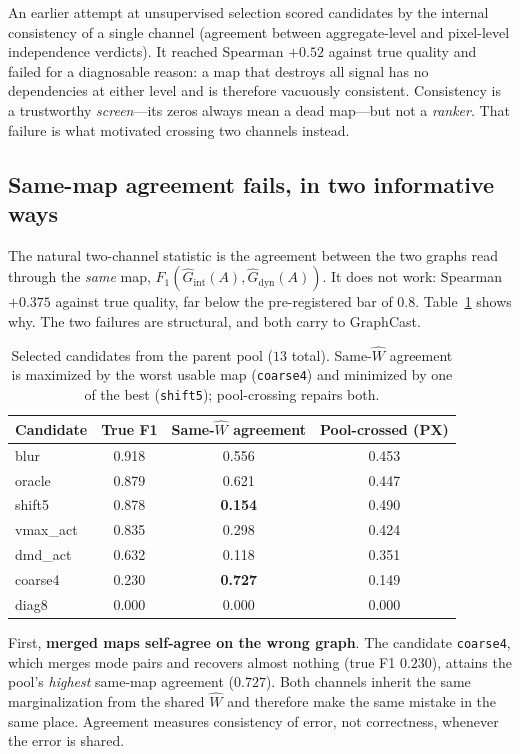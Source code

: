 An earlier attempt at unsupervised selection scored candidates by the internal
consistency of a single channel (agreement between aggregate-level and
pixel-level independence verdicts). It reached Spearman $+0.52$ against true
quality and failed for a diagnosable reason: a map that destroys all signal has no
dependencies at either level and is therefore vacuously consistent. Consistency is
a trustworthy \emph{screen}---its zeros always mean a dead map---but not a
\emph{ranker}. That failure is what motivated crossing two channels instead.

\subsection{Same-map agreement fails, in two informative ways}

The natural two-channel statistic is the agreement between the two graphs read
through the \emph{same} map, $F_1(\hat G_{\text{int}}(A), \hat G_{\text{dyn}}(A))$.
It does not work: Spearman $+0.375$ against true quality, far below the
pre-registered bar of $0.8$. Table~\ref{tab:samew} shows why. The two failures are
structural, and both carry to GraphCast.

\begin{table}[h]
\centering
\small
\begin{tabular}{lccc}
\toprule
Candidate & True F1 & Same-$\hat W$ agreement & Pool-crossed (PX) \\
\midrule
blur      & 0.918 & 0.556 & 0.453 \\
oracle    & 0.879 & 0.621 & 0.447 \\
shift5    & 0.878 & \textbf{0.154} & 0.490 \\
vmax\_act & 0.835 & 0.298 & 0.424 \\
dmd\_act  & 0.632 & 0.118 & 0.351 \\
coarse4   & 0.230 & \textbf{0.727} & 0.149 \\
diag8     & 0.000 & 0.000 & 0.000 \\
\bottomrule
\end{tabular}
\caption{Selected candidates from the parent pool ($13$ total). Same-$\hat W$
agreement is maximized by the worst usable map (\texttt{coarse4}) and minimized by
one of the best (\texttt{shift5}); pool-crossing repairs both.}
\label{tab:samew}
\end{table}

First, \textbf{merged maps self-agree on the wrong graph}. The candidate
\texttt{coarse4}, which merges mode pairs and recovers almost nothing
(true F1 $0.230$), attains the pool's \emph{highest} same-map agreement
($0.727$). Both channels inherit the same marginalization from the shared $\hat W$
and therefore make the same mistake in the same place. Agreement measures
consistency of error, not correctness, whenever the error is shared.

